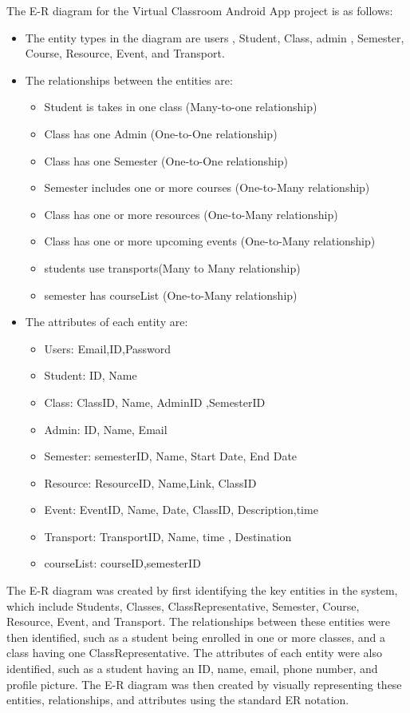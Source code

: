  

The E-R diagram for the Virtual Classroom Android App project is as follows:

\begin{itemize}

\item The entity types in the diagram are users , Student, Class, admin , Semester, Course, Resource, Event, and Transport.

\item The relationships between the entities are:
    \begin{itemize}
   \item  Student is takes in one class (Many-to-one relationship)
   \item Class has one Admin (One-to-One relationship)
   \item Class has one Semester (One-to-One relationship)
   \item Semester includes one or more courses (One-to-Many relationship)
   \item Class has one or more resources (One-to-Many relationship)
   \item Class has one or more upcoming events (One-to-Many relationship)
   \item students use transports(Many to Many relationship) 
   \item semester has courseList (One-to-Many relationship)
    \end{itemize}
  \item The attributes of each entity are:
   \begin{itemize}
   \item Users: Email,ID,Password 
   \item Student: ID, Name 
   \item Class: ClassID, Name, AdminID ,SemesterID
   \item Admin: ID, Name, Email 
   \item Semester: semesterID, Name, Start Date, End Date 

  \item Resource: ResourceID, Name,Link, ClassID
  \item Event: EventID, Name, Date, ClassID, Description,time 
  \item Transport: TransportID, Name, time , Destination
  \item courseList: courseID,semesterID 
  
  
   \end{itemize}

\end{itemize}

The E-R diagram was created by first identifying the key entities in the system, which include Students, Classes, ClassRepresentative, Semester, Course, Resource, Event, and Transport. The relationships between these entities were then identified, such as a student being enrolled in one or more classes, and a class having one ClassRepresentative. The attributes of each entity were also identified, such as a student having an ID, name, email, phone number, and profile picture. The E-R diagram was then created by visually representing these entities, relationships, and attributes using the standard ER notation.

